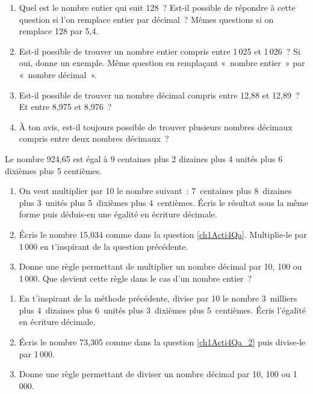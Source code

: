\begin{activite}
\begin{partie}[Intercaler]
\begin{enumerate}
 \item Quel est le nombre entier qui suit 128 ? Est-il possible de répondre à cette question si l'on remplace entier par décimal ?
Mêmes questions si on remplace 128 par 5,4.
 \item Est-il possible de trouver un nombre entier compris entre 1\,025 et 1\,026 ? Si oui, donne un exemple.
Même question en remplaçant « nombre entier » par « nombre décimal ».
 \item Est-il possible de trouver un nombre décimal compris entre 12,88 et 12,89 ? Et entre 8,975 et 8,976 ?
 \item À ton avis, est-il toujours possible de trouver plusieurs nombres décimaux compris entre deux nombres décimaux ?
 \end{enumerate}
\end{partie}

\end{activite}



\begin{activite}

\begin{partie}
Le nombre 924,65 est égal à 9 centaines plus 2 dizaines plus 4 unités plus 6 dixièmes plus 5 centièmes.
\begin{enumerate}
 \item On veut multiplier par 10 le nombre suivant : 7 centaines plus 8 dizaines plus 3 unités plus 5 dixièmes plus 4 centièmes. Écris le résultat sous la même forme puis déduis‑en une égalité en écriture décimale. \label{ch1Acti4Qa}
 \item Écris le nombre 15,034 comme dans la question \ref{ch1Acti4Qa}. Multiplie‑le par 1\,000 en t'inspirant de la question précédente.
 \item Donne une règle permettant de multiplier un nombre décimal par 10, 100 ou 1\,000. Que devient cette règle dans le cas d'un nombre entier ?
 \end{enumerate}
\end{partie}

\begin{partie}
\begin{enumerate}
 \item En t'inspirant de la méthode précédente, divise par 10 le nombre 3 milliers plus 4 dizaines plus 6 unités plus 3 dixièmes plus 5 centièmes. Écris l'égalité en écriture décimale. \label{ch1Acti4Qa_2}
 \item Écris le nombre 73,305 comme dans la question \ref{ch1Acti4Qa_2} puis divise‑le par 1\,000.
 \item Donne une règle permettant de diviser un nombre décimal par 10, 100 ou 1\,000.
 \end{enumerate}
\end{partie}

\end{activite}


